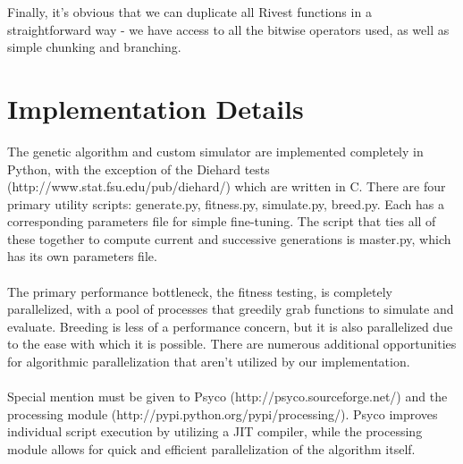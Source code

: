 \documentclass{article}
\begin{document}
Finally, it's obvious that we can duplicate all Rivest functions in a straightforward way - we have access to all the bitwise operators used, as well as simple chunking and branching.

\section{Implementation Details}
The genetic algorithm and custom simulator are implemented completely in Python, with the exception of the Diehard tests (http://www.stat.fsu.edu/pub/diehard/) which are written in C. There are four primary utility scripts: generate.py, fitness.py, simulate.py, breed.py. Each has a corresponding parameters file for simple fine-tuning. The script that ties all of these together to compute current and successive generations is master.py, which has its own parameters file.

\paragraph{}
The primary performance bottleneck, the fitness testing, is completely parallelized, with a pool of processes that greedily grab functions to simulate and evaluate. Breeding is less of a performance concern, but it is also parallelized due to the ease with which it is possible. There are numerous additional opportunities for algorithmic parallelization that aren't utilized by our implementation.

\paragraph{}
Special mention must be given to Psyco (http://psyco.sourceforge.net/) and the processing module (http://pypi.python.org/pypi/processing/). Psyco improves individual script execution by utilizing a JIT compiler, while the processing module allows for quick and efficient parallelization of the algorithm itself.
\end{document}
